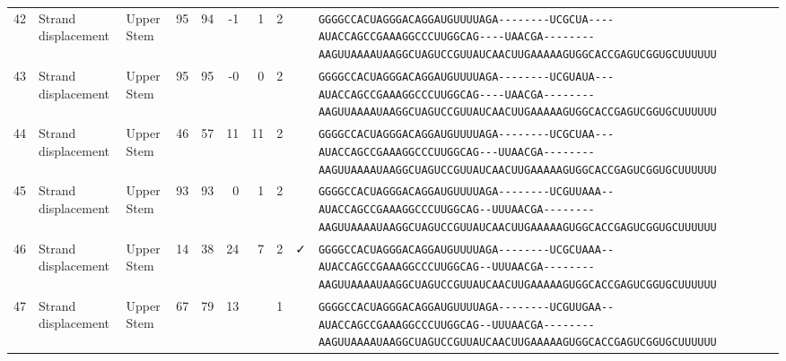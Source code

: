 \begin{tabular}{rllrrrrrcl}
 42 & Strand displacement & Upper Stem & 95 & 94 & -1 & 1 & 2 &  &
 \color{ucsfblack}\verb|GGGGCCACUAGGGACAGGAU|\color{ucsfblue}\verb|GUUUUAGA--------UCGCUA----|\color{ucsfpurple}\verb|AUACCAGCCGAAAGGCCCUUGGCAG|\color{ucsfblue}\verb|----UAACGA--------AAGUUAAAAU|\color{ucsfnavy}\verb|AAGGCUAGUCCGU|\color{ucsfteal}\verb|UAUCAACUUGAAAAAGUGGCACCGAGUCGGUGC|\color{ucsfblack}\verb|UUUUUU| \\

 43 & Strand displacement & Upper Stem & 95 & 95 & -0 & 0 & 2 &  &
 \color{ucsfblack}\verb|GGGGCCACUAGGGACAGGAU|\color{ucsfblue}\verb|GUUUUAGA--------UCGUAUA---|\color{ucsfpurple}\verb|AUACCAGCCGAAAGGCCCUUGGCAG|\color{ucsfblue}\verb|----UAACGA--------AAGUUAAAAU|\color{ucsfnavy}\verb|AAGGCUAGUCCGU|\color{ucsfteal}\verb|UAUCAACUUGAAAAAGUGGCACCGAGUCGGUGC|\color{ucsfblack}\verb|UUUUUU| \\

 44 & Strand displacement & Upper Stem & 46 & 57 & 11 & 11 & 2 &  &
 \color{ucsfblack}\verb|GGGGCCACUAGGGACAGGAU|\color{ucsfblue}\verb|GUUUUAGA--------UCGCUAA---|\color{ucsfpurple}\verb|AUACCAGCCGAAAGGCCCUUGGCAG|\color{ucsfblue}\verb|---UUAACGA--------AAGUUAAAAU|\color{ucsfnavy}\verb|AAGGCUAGUCCGU|\color{ucsfteal}\verb|UAUCAACUUGAAAAAGUGGCACCGAGUCGGUGC|\color{ucsfblack}\verb|UUUUUU| \\

 45 & Strand displacement & Upper Stem & 93 & 93 & 0 & 1 & 2 &  &
 \color{ucsfblack}\verb|GGGGCCACUAGGGACAGGAU|\color{ucsfblue}\verb|GUUUUAGA--------UCGUUAAA--|\color{ucsfpurple}\verb|AUACCAGCCGAAAGGCCCUUGGCAG|\color{ucsfblue}\verb|--UUUAACGA--------AAGUUAAAAU|\color{ucsfnavy}\verb|AAGGCUAGUCCGU|\color{ucsfteal}\verb|UAUCAACUUGAAAAAGUGGCACCGAGUCGGUGC|\color{ucsfblack}\verb|UUUUUU| \\

 46 & Strand displacement & Upper Stem & 14 & 38 & 24 & 7 & 2 & ✓ &
 \color{ucsfblack}\verb|GGGGCCACUAGGGACAGGAU|\color{ucsfblue}\verb|GUUUUAGA--------UCGCUAAA--|\color{ucsfpurple}\verb|AUACCAGCCGAAAGGCCCUUGGCAG|\color{ucsfblue}\verb|--UUUAACGA--------AAGUUAAAAU|\color{ucsfnavy}\verb|AAGGCUAGUCCGU|\color{ucsfteal}\verb|UAUCAACUUGAAAAAGUGGCACCGAGUCGGUGC|\color{ucsfblack}\verb|UUUUUU| \\

 47 & Strand displacement & Upper Stem & 67 & 79 & 13 &  & 1 &  &
 \color{ucsfblack}\verb|GGGGCCACUAGGGACAGGAU|\color{ucsfblue}\verb|GUUUUAGA--------UCGUUGAA--|\color{ucsfpurple}\verb|AUACCAGCCGAAAGGCCCUUGGCAG|\color{ucsfblue}\verb|--UUUAACGA--------AAGUUAAAAU|\color{ucsfnavy}\verb|AAGGCUAGUCCGU|\color{ucsfteal}\verb|UAUCAACUUGAAAAAGUGGCACCGAGUCGGUGC|\color{ucsfblack}\verb|UUUUUU| \\


\end{tabular}
